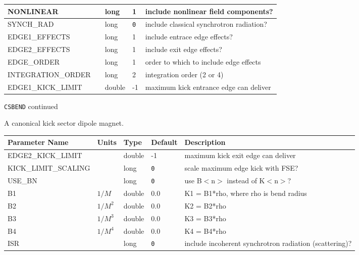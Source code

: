 \begin{tabular}{|l|l|l|l|p{\descwidth}|}
NONLINEAR &  & long &   1               & include nonlinear field components?  \\ \hline 
SYNCH\_RAD &  & long &  \verb|0| & include classical synchrotron radiation?  \\ \hline 
EDGE1\_EFFECTS &  & long &   1               & include entrace edge effects?  \\ \hline 
EDGE2\_EFFECTS &  & long &   1               & include exit edge effects?  \\ \hline 
EDGE\_ORDER &  & long &   1               & order to which to include edge effects  \\ \hline 
INTEGRATION\_ORDER &  & long &   2               & integration order (2 or 4)  \\ \hline 
EDGE1\_KICK\_LIMIT &  & double &   -1 & maximum kick entrance edge can deliver  \\ \hline 
\end{tabular}

\begin{latexonly}
\newpage
\begin{center}{\Large\verb|CSBEND| continued}\end{center}
\end{latexonly}
A canonical kick sector dipole magnet.
\\
\begin{tabular}{|l|l|l|l|p{\descwidth}|} \hline
Parameter Name & Units & Type & Default & Description \\ \hline 
EDGE2\_KICK\_LIMIT &  & double &   -1 & maximum kick exit edge can deliver  \\ \hline 
KICK\_LIMIT\_SCALING &  & long &  \verb|0| & scale maximum edge kick with FSE?  \\ \hline 
USE\_BN &  & long &  \verb|0| & use B$<$n$>$ instead of K$<$n$>$?  \\ \hline 
B1 & $1/M$ & double &  0.0 & K1 = B1*rho, where rho is bend radius  \\ \hline 
B2 & $1/M^{2}$ & double &  0.0 & K2 = B2*rho  \\ \hline 
B3 & $1/M^{3}$ & double &  0.0 & K3 = B3*rho  \\ \hline 
B4 & $1/M^{4}$ & double &  0.0 & K4 = B4*rho  \\ \hline 
ISR &  & long &  \verb|0| & include incoherent synchrotron radiation (scattering)?  \\ \hline 
\end{tabular}

